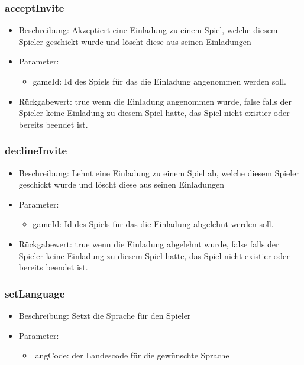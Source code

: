 \documentclass[a4paper]{scrreprt}
\begin{document}
    \subsubsection{acceptInvite}
    \begin{itemize}
        \item Beschreibung: Akzeptiert eine Einladung zu einem Spiel, welche diesem Spieler geschickt wurde und löscht diese aus seinen Einladungen
        \item Parameter:
        \begin{itemize}
            \item gameId: Id des Spiels für das die Einladung angenommen werden soll.
        \end{itemize}
        \item Rückgabewert: true wenn die Einladung angenommen wurde, false falls der Spieler keine Einladung zu diesem Spiel hatte, das Spiel nicht existier oder bereits beendet ist. 
    \end{itemize}
    \subsubsection{declineInvite}
    \begin{itemize}
        \item Beschreibung: Lehnt eine Einladung zu einem Spiel ab, welche diesem Spieler geschickt wurde und löscht diese aus seinen Einladungen
        \item Parameter:
        \begin{itemize}
            \item gameId: Id des Spiels für das die Einladung abgelehnt werden soll.
        \end{itemize}
        \item Rückgabewert: true wenn die Einladung abgelehnt wurde, false falls der Spieler keine Einladung zu diesem Spiel hatte, das Spiel nicht existier oder bereits beendet ist. 
    \end{itemize}
    \subsubsection{setLanguage}
    \begin{itemize}
        \item Beschreibung: Setzt die Sprache für den Spieler
        \item Parameter:
        \begin{itemize}
            \item langCode: der Landescode für die gewünschte Sprache
        \end{itemize}
    \end{itemize}
\end{document}
